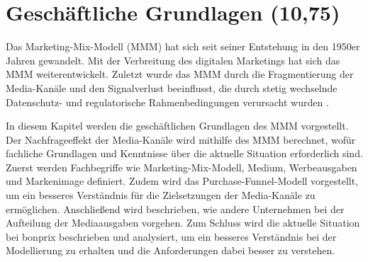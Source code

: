 \newpage
\section{Geschäftliche Grundlagen (10,75)}
\label{GeschäftlicheGrundlagen}
Das Marketing-Mix-Modell (\ac{MMM}) hat sich seit seiner Entstehung in den 1950er Jahren gewandelt. Mit der Verbreitung des digitalen Marketings hat sich das \ac{MMM} weiterentwickelt. Zuletzt wurde das \ac{MMM} durch die Fragmentierung der Media-Kanäle und den Signalverlust beeinflusst, die durch stetig wechselnde Datenschutz- und regulatorische Rahmenbedingungen verursacht wurden \cite[1]{MMMdef}. \par
In diesem Kapitel werden die geschäftlichen Grundlagen des \ac{MMM} vorgestellt. Der Nachfrageeffekt der Media-Kanäle wird mithilfe des \ac{MMM} berechnet, wofür fachliche Grundlagen und Kenntnisse über die aktuelle Situation erforderlich sind. Zuerst werden Fachbegriffe wie Marketing-Mix-Modell, Medium, Werbeausgaben und Markenimage definiert. Zudem wird das Purchase-Funnel-Modell vorgestellt, um ein besseres Verständnis für die Zielsetzungen der Media-Kanäle zu ermöglichen. Anschließend wird beschrieben, wie andere Unternehmen bei der Aufteilung der Mediaausgaben vorgehen. Zum Schluss wird die aktuelle Situation bei bonprix beschrieben und analysiert, um ein besseres Verständnis bei der Modellierung zu erhalten und die Anforderungen dabei besser zu verstehen.
